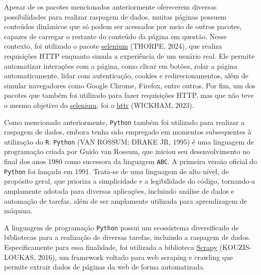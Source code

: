 \documentclass[
  12pt,
  a4paper,
]{scrreprt}
\begin{document}
\vspace{12pt}

Apesar de os pacotes mencionados anteriormente oferecerem diversas
possibilidades para realizar raspagem de dados, muitas páginas possuem
conteúdos dinâmicos que só podem ser acessados por meio de outros
pacotes, capazes de carregar o restante do conteúdo da página em
questão. Nesse contexto, foi utilizado o pacote
\href{https://cran.r-project.org/web/packages/selenium/index.html}{selenium}
(THORPE, 2024), que realiza requisições HTTP enquanto simula a
experiência de um usuário real. Ele permite automatizar interações com a
página, como clicar em botões, rolar a página automaticamente, lidar com
autenticação, cookies e redirecionamentos, além de simular navegadores
como Google Chrome, Firefox, entre outros. Por fim, um dos pacotes que
também foi utilizado para fazer requisições HTTP, mas que não teve o
mesmo objetivo do
\href{https://cran.r-project.org/web/packages/selenium/index.html}{selenium},
foi o \href{https://httr.r-lib.org/}{httr} (WICKHAM, 2023).

\vspace{12pt}

Como mencionado anteriormente, \texttt{Python} também foi utilizado para
realizar a raspagem de dados, embora tenha sido empregado em momentos
subsequentes à utilização do \texttt{R}. \texttt{Python} (VAN ROSSUM;
DRAKE JR, 1995) é uma linguagem de programação criada por Guido van
Rossum, que iniciou seu desenvolvimento no final dos anos 1980 como
sucessora da linguagem \texttt{ABC}. A primeira versão oficial do
\texttt{Python} foi lançada em 1991. Trata-se de uma linguagem de alto
nível, de propósito geral, que prioriza a simplicidade e a legibilidade
do código, tornando-a amplamente adotada para diversas aplicações,
incluindo análise de dados e automação de tarefas, além de ser
amplamente utilizada para aprendizagem de máquina.

\vspace{12pt}

A linguagem de programação \texttt{Python} possui um ecossistema
diversificado de bibliotecas para a realização de diversas tarefas,
incluindo a raspagem de dados. Especificamente para essa finalidade, foi
utilizada a biblioteca \href{https://docs.scrapy.org/en/latest}{Scrapy}
(KOUZIS-LOUKAS, 2016), um framework voltado para web scraping e crawling
que permite extrair dados de páginas da web de forma automatizada.

\vspace{12pt}
\end{document}
